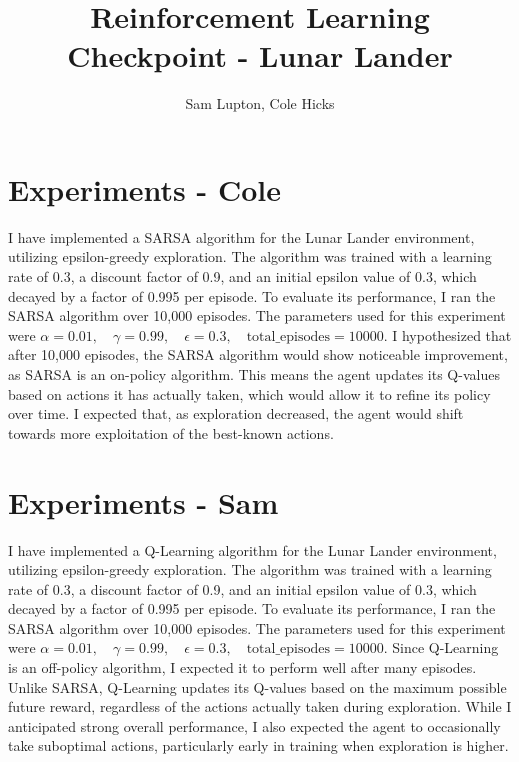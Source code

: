\documentclass[journal]{IEEEtran}
\title{Reinforcement Learning Checkpoint - Lunar Lander}
\author{Sam Lupton, Cole Hicks}
\begin{document}
\makeatletter
\def\@maketitle{%
  \newpage
  \null
  \vskip 2em%
  \begin{center}%
    \underline{\textbf{\LARGE\@title}}\par
    \vskip 1em
    {\large
      \lineskip .5em%
      \begin{tabular}[t]{c}%
        \textbf{\@author}%
      \end{tabular}\par}%
  \end{center}%
  \vskip 1.5em}
\makeatother

\maketitle

\section{Experiments - Cole}
I have implemented a SARSA algorithm for the Lunar Lander environment, utilizing epsilon-greedy exploration. The algorithm was trained with a learning rate of 0.3, a discount factor of 0.9, and an initial epsilon value of 0.3, which decayed by a factor of 0.995 per episode. To evaluate its performance, I ran the SARSA algorithm over 10,000 episodes. The parameters used for this experiment were $\alpha = 0.01, \quad \gamma = 0.99, \quad \epsilon = 0.3, \quad \text{total\_episodes} = 10000$. I hypothesized that after 10,000 episodes, the SARSA algorithm would show noticeable improvement, as SARSA is an on-policy algorithm. This means the agent updates its Q-values based on actions it has actually taken, which would allow it to refine its policy over time. I expected that, as exploration decreased, the agent would shift towards more exploitation of the best-known actions.

\section{Experiments - Sam}

I have implemented a Q-Learning algorithm for the Lunar Lander environment, utilizing epsilon-greedy exploration. The algorithm was trained with a learning rate of 0.3, a discount factor of 0.9, and an initial epsilon value of 0.3, which decayed by a factor of 0.995 per episode. To evaluate its performance, I ran the SARSA algorithm over 10,000 episodes. The parameters used for this experiment were $\alpha = 0.01, \quad \gamma = 0.99, \quad \epsilon = 0.3, \quad \text{total\_episodes} = 10000$. Since Q-Learning is an off-policy algorithm, I expected it to perform well after many episodes. Unlike SARSA, Q-Learning updates its Q-values based on the maximum possible future reward, regardless of the actions actually taken during exploration. While I anticipated strong overall performance, I also expected the agent to occasionally take suboptimal actions, particularly early in training when exploration is higher.
\end{document}
